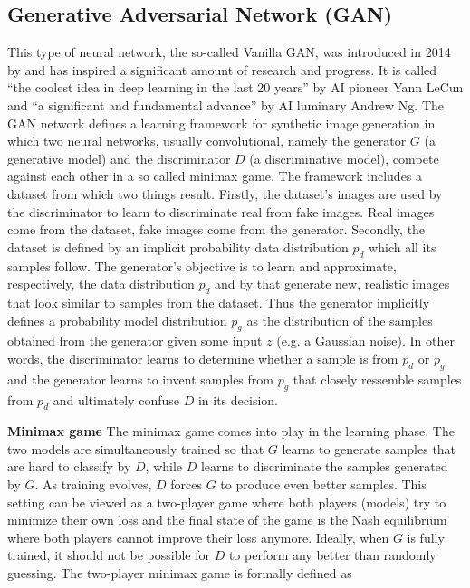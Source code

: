 \documentclass[12pt,a4paper]{article}
\begin{document}
\subsection{Generative Adversarial Network (GAN)}
This type of neural network, the so-called Vanilla GAN, was introduced in 2014 by \cite{1406.2661} and has inspired a significant amount of research and progress. It is called ``the coolest idea in deep learning in the last 20 years'' by AI pioneer Yann LeCun and ``a significant and fundamental advance'' by AI luminary Andrew Ng. The GAN network defines a learning framework for synthetic image generation in which two neural networks, usually convolutional, namely the generator $G$ (a generative model) and the discriminator $D$ (a discriminative model), compete against each other in a so called minimax game. The framework includes a dataset from which two things result. Firstly, the dataset's images are used by the discriminator to learn to discriminate real from fake images. Real images come from the dataset, fake images come from the generator. Secondly, the dataset is defined by an implicit probability data distribution $p_d$ which all its samples follow. The generator's objective is to learn and approximate, respectively, the data distribution $p_d$ and by that generate new, realistic images that look similar to samples from the dataset. Thus the generator implicitly defines a probability model distribution $p_g$ as the distribution of the samples obtained from the generator given some input $z$ (e.g. a Gaussian noise). In other words, the discriminator learns to determine whether a sample is from $p_d$ or $p_g$ and the generator learns to invent samples from $p_g$ that closely ressemble samples from $p_d$ and ultimately confuse $D$ in its decision.
\par \textbf{Minimax game} The minimax game comes into play in the learning phase. The two models are simultaneously trained so that $G$ learns to generate samples that are hard to classify by $D$, while $D$ learns to discriminate the samples generated by $G$. As training evolves, $D$ forces $G$ to produce even better samples. This setting can be viewed as a two-player game where both players (models) try to minimize their own loss and the final state of the game is the Nash equilibrium where both players cannot improve their loss anymore. Ideally, when $G$ is fully trained, it should not be possible for $D$ to perform any better than randomly guessing. The two-player minimax game is formally defined as
\end{document}
